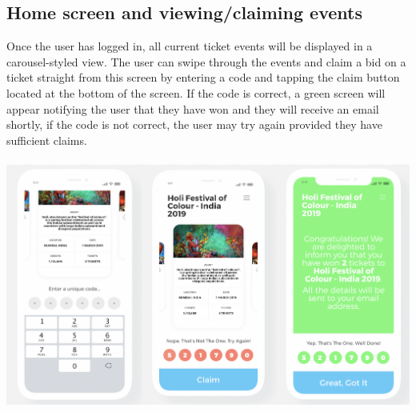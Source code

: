 \documentclass[11pt]{article}
\begin{document}
	\subsection{Home screen and viewing/claiming events}
	Once the user has logged in, all current ticket events will be displayed in a carousel-styled view. The user can swipe through 
	the events and claim a bid on a ticket straight from this screen by entering a code and tapping the claim button located at the bottom of the screen. If the code is correct, a green screen will appear notifying the user that they have won and they will receive an email shortly, if the code is not correct, the user may try again provided they have sufficient claims.
	\\
	\\
	\includegraphics[width=\linewidth]{homescreen.png}
	\pagebreak
\end{document}
